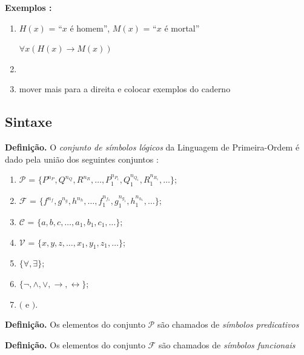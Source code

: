             \textbf{Exemplos :}
            \begin{enumerate}[left=0.5cm, align=left, nosep]
                \item $H(x)$ = “$x$ é homem”, $M(x)$ = “$x$ é mortal”                
                    
                    \hspace{2cm} $\forall x ( H(x) \rightarrow  M(x) )$
            
                \item
                \item
                
            
                mover mais para a direita e colocar exemplos do caderno 
            
            
            \end{enumerate}
    
    \subsection{Sintaxe}
        \textbf{Definição.} O \textit{conjunto de símbolos lógicos} da Linguagem de Primeira-Ordem é dado pela 
        união dos seguintes conjuntos : 
            \begin{enumerate}[left=0.5cm, align=left, nosep]
                \item $\mathcal{P}$ = $\{ P^{n_P},Q^{n_Q},R^{n_R},\dots,P_1^{n_{P_1}},Q_1^{n_{Q_1}},R_1^{n_{R_1}},\dots \}$;
                \item $\mathcal{F}$ = $\{ f^{n_f},g^{n_g},h^{n_h},\dots,f_1^{n_{f_1}},g_1^{n_{g_1}},h_1^{n_{h_1}},\dots \}$;
                \item $\mathcal{C}$ = $\{a,b,c,\dots,a_1,b_1,c_1,\dots\}$;
                \item $\mathcal{V}$ = $\{x,y,z,\dots,x_1,y_1,z_1,\dots\}$;
                \item $\{ \forall,\exists \}$;  
                \item $\{ \neg,\land,\lor,\rightarrow,\leftrightarrow \}$;  
                \item $($ e $)$.   
            \end{enumerate}

        \textbf{Definição.} Os elementos do conjunto $\mathcal{P}$ são chamados de \textit{símbolos predicativos} 
        
        \textbf{Definição.} Os elementos do conjunto $\mathcal{F}$ são chamados de \textit{símbolos funcionais} 
        
